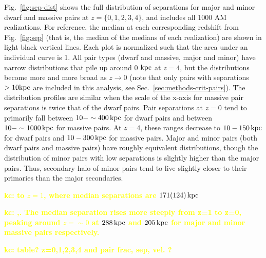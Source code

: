 \documentclass[twocolumn]{aastex631}
\newcommand{\kc}[1]{\textcolor{yellow}{\textbf{kc: #1}} }
\begin{document}
Fig.~\ref{fig:sep-dist} shows the full distribution of separations for major and minor dwarf and massive pairs at $z=\{0,1,2,3,4\}$, and includes all 1000 AM realizations. 
For reference, the median at each corresponding redshift from Fig.~\ref{fig:sep} (that is, the median of the medians of each realization) are shown in light black vertical lines.
Each plot is normalized such that the area under an individual curve is 1.
All pair types (dwarf and massive, major and minor) have narrow distributions that pile up around 0 $\mathrm{kpc}$ at $z=4$, but the distributions become more and more broad as $z\to0$ (note that only pairs with separations $>10\mathrm{kpc}$ are included in this analysis, see Sec.~\ref{sec:methods-crit-pairs}).
\linebreak
The distribution profiles are similar when the scale of the x-axis for massive pair separations is twice that of the dwarf pairs. 
Pair separations at $z=0$ tend to primarily fall between $10-\sim400\,\mathrm{kpc}$ for dwarf pairs and   between $10-\sim1000\,\mathrm{kpc}$ for massive pairs. 
At $z=4$, these ranges decrease to $10-150\,\mathrm{kpc}$ for dwarf pairs and $10-300\,\mathrm{kpc}$ for massive pairs. 
Major and minor pairs (both dwarf pairs and massive pairs) have roughly equivalent distributions, though the distribution of minor pairs with low separations is slightly higher than the major pairs. Thus, secondary halo of minor pairs tend to live slightly closer to their primaries than the  major secondaries.

\kc{ to $z=1$, where median separations are $171(124)\,\mathrm{kpc}$}

\kc{ ,. The median separation rises more steeply from z=1 to z=0, peaking around $z=\sim0$ at $288\,\mathrm{kpc}$ and $205\,\mathrm{kpc}$ for major and minor massive pairs respectively.}

\kc{table? z=0,1,2,3,4 and pair frac, sep, vel. ?}
\end{document}
